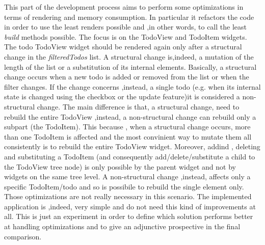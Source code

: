 
This part of the development process aims to perform some optimizations in terms of rendering and memory consumption. In particular it refactors the code in order to use the least renders possible and ,in other words, to call the least \textit{build} methods possible. The focus is on the TodoView and TodoItem widgets. The todo TodoView widget should be rendered again only after a structural change in the \textit{filteredTodos} list. A structural change is,indeed,  a mutation of the length of the list or a substitution of its internal elements. Basically, a structural change occurs when a new todo is added or removed from the list or when the filter changes. If the change concerns ,instead, a single todo (e.g. when its internal state is changed using the checkbox or the update feature)it is considered a non-structural change. The main difference is that, a structural change, need to rebuild the entire TodoView ,instead, a non-structural change can rebuild only a subpart (the TodoItem). This because , when a structural change occurs, more than one TodoItem is affected and the most convinient way to mutate them all consistently is to rebuild the entire TodoView widget. Moreover, addind , deleting and substituting a TodoItem (and consequently add/delete/substitute a child to the TodoView tree node) is only possible by the parent widget and not by widgets on the same tree level. A non-structural change ,instead, affects only a specific TodoItem/todo and so is possibile to rebuild the single element only. Those optimizations are not really necessary in this scenario. The implemented application is ,indeed, very simple and do not need this kind of improvements at all. This is just an experiment in order to define which solution performs better at handling optimizations and to give an adjunctive prospective in the final comparison.